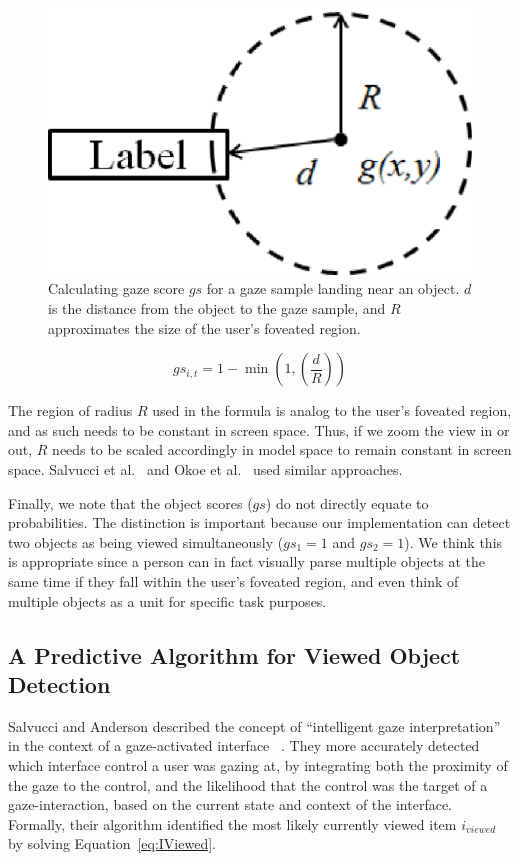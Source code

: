\begin{figure}[htb]
  \centering
  \includegraphics[width=0.4\linewidth]{images/gazeScoreFig3.eps}
  \caption{Calculating gaze score $gs$ for a gaze sample landing near an object. $d$ is the distance from the object to the gaze sample, and $R$ approximates the size of the user's foveated region.}
	\label{fig:gazeScoreFig3}
\end{figure}

\begin{equation}
gs_{i,t} = 1 - \min (1, (\frac{d}{R}))
\label{eq:GS}
\end{equation}

The region of radius $R$ used in the formula is analog to the user's foveated region, and as such needs to be constant in screen space. Thus, if we zoom the view in or out, $R$ needs to be scaled accordingly in model space to remain constant in screen space.  Salvucci et al.~\cite{Sal00} and Okoe et al.~\cite{Okoe14} used similar approaches.

Finally, we note that the object scores ($gs$) do not directly equate to probabilities. The distinction is important because our implementation can detect two objects as being viewed simultaneously ($gs_1 = 1$ and $gs_2=1$). We think this is appropriate since a person can in fact visually parse multiple objects at the same time if they fall within the user's foveated region, and even think of multiple objects as a unit for specific task purposes.



\subsection{A Predictive Algorithm for Viewed Object Detection}
\label{sec:MehthodsIntelligentAlgorithm}

Salvucci and Anderson described the concept of ``intelligent gaze interpretation'' in the context of a gaze-activated interface ~\cite{Sal00}. They more accurately detected which interface control a user was gazing at, by integrating both the proximity of the gaze to the control, and the likelihood that the control was the target of a gaze-interaction, based on the current state and context of the interface. Formally, their algorithm identified the most likely currently viewed item $i_{viewed}$ by solving Equation~\ref{eq:IViewed}.

